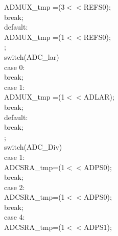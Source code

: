 \documentclass[titlepage, a4paper, 10pt, reqno, openany]{report}
\begin{document}
\begin{minipage}[t]{.3\linewidth}
\hspace*{1.5cm}			ADMUX\_tmp \textbar =(3$<<$REFS0); \\
\hspace*{1.5cm}			break; \\
\hspace*{1cm}		default: \\
\hspace*{1.5cm}			ADMUX\_tmp \textbar =(1$<<$REFS0); \\
\hspace*{.5cm}	\textbraceright ; \\
\hspace*{.5cm}	switch(ADC\_lar)\textbraceleft \\
\hspace*{1cm}		case 0: \\
\hspace*{1.5cm}			break; \\
\hspace*{1cm}		case 1: \\
\hspace*{1.5cm}			ADMUX\_tmp \textbar =(1$<<$ADLAR); \\
\hspace*{1.5cm}			break; \\
\hspace*{1cm}		default: \\
\hspace*{1.5cm}			break; \\
\hspace*{.5cm}	\textbraceright ; \\
\hspace*{.5cm}	switch(ADC\_Div)\textbraceleft \\
\hspace*{1cm}		case 1: \\
\hspace*{1.5cm}			ADCSRA\_tmp=(1$<<$ADPS0); \\
\hspace*{1.5cm}			break; \\
\hspace*{1cm}		case 2: \\
\hspace*{1.5cm}			ADCSRA\_tmp=(1$<<$ADPS0); \\
\hspace*{1.5cm}			break; \\
\hspace*{1cm}		case 4: \\
\hspace*{1.5cm}			ADCSRA\_tmp=(1$<<$ADPS1); \\

\end{minipage}
\end{document}
